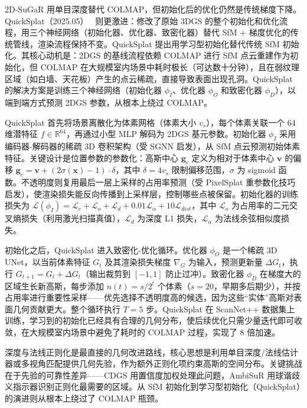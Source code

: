 2D-SuGaR 用单目深度替代 COLMAP，但初始化后的优化仍然是传统梯度下降。QuickSplat（2025.05）~\cite{2505_05591} 则更激进：修改了原始 3DGS 的整个初始化和优化流程，用三个神经网络（初始化器、优化器、致密化器）替代 SfM + 梯度优化的传统管线，渲染流程保持不变。QuickSplat 提出用学习型初始化替代传统 SfM 初始化。其核心动机是：2DGS 的基线流程依赖 COLMAP 进行 SfM 点云重建作为初始化，但 COLMAP 在大规模室内场景中耗时极长（可达数十分钟），且在弱纹理区域（如白墙、天花板）产生的点云稀疏，直接导致表面出现孔洞。QuickSplat 的解决方案是训练三个神经网络（初始化器 $\phi_I$、优化器 $\phi_O$ 和致密化器 $\phi_D$），以端到端方式预测 2DGS 参数，从根本上绕过 COLMAP。

QuickSplat 首先将场景离散化为体素网格（体素大小 $v_s$），每个体素关联一个 64 维潜特征 $f \in \mathbb{R}^{64}$，再通过小型 MLP 解码为 2DGS 基元参数。初始化器 $\phi_I$ 采用编码器-解码器的稀疏 3D 卷积架构（受 SGNN 启发），从 SfM 点云预测初始体素特征。关键设计是位置参数的参数化：高斯中心 $\mathbf{g}_c$ 定义为相对于体素中心 $\mathbf{v}$ 的偏移 $\mathbf{g}_c = \mathbf{v} + (2\sigma(\mathbf{x}) - 1) \cdot \delta$，其中 $\delta = 4v_s$ 限制偏移范围，$\sigma$ 为 sigmoid 函数。不透明度则复用最后一层上采样的占用率预测（受 PixelSplat 重参数化技巧启发），使渲染损失能反向传播到上采样层，控制哪些点被保留。初始化器的训练损失为 $\mathcal{L}(\phi_I) = \mathcal{L}_c + \mathcal{L}_o + \mathcal{L}_d + 0.01\mathcal{L}_\alpha + 10\mathcal{L}_{dist}$，其中 $\mathcal{L}_o$ 为占用率的二元交叉熵损失（利用激光扫描真值），$\mathcal{L}_d$ 为深度 L1 损失，$\mathcal{L}_\alpha$ 为法线余弦相似度损失。

初始化之后，QuickSplat 进入致密化-优化循环。优化器 $\phi_O$ 是一个稀疏 3D UNet，以当前体素特征 $G_t$ 及其渲染损失梯度 $\nabla_G$ 为输入，预测更新量 $\Delta G_t$，执行 $G_{t+1} = G_t + \Delta G_t$（输出裁剪到 $[-1,1]$ 防止过冲）。致密化器 $\phi_D$ 在梯度大的区域生长新高斯，每步添加 $n(t) = s / 2^t$ 个体素（$s=20$，早期多后期少），并按占用率进行重要性采样——优先选择不透明度高的候选，因为这些“实体”高斯对表面几何贡献更大。整个循环执行 $T=5$ 步。QuickSplat 在 ScanNet++ 数据集上训练，学习到的初始化已经具有合理的几何分布，使后续优化只需少量迭代即可收敛，在大规模室内场景中避免了耗时的 COLMAP 过程，实现了 8 倍加速。

\begin{takeaway}
深度与法线正则化是最直接的几何改进路线，核心思想是利用单目深度/法线估计器或多视角匹配提供几何先验，作为额外正则化项约束高斯的空间分布。关键挑战在于先验的可靠性差异——CDGS 用置信度加权处理此问题，AmbiSuR 用球谐歧义指示器识别正则化最需要的区域。从 SfM 初始化到学习型初始化（QuickSplat）的演进则从根本上绕过了 COLMAP 瓶颈。
\end{takeaway}

